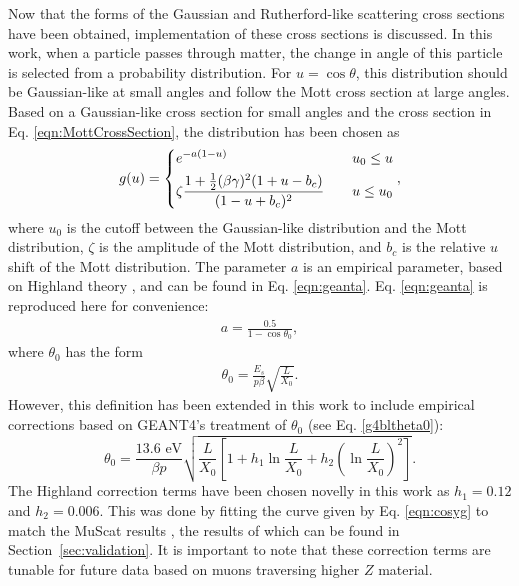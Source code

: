 \label{ssc:COSYScatteringImplementation} Now that the forms of the Gaussian and Rutherford-like scattering cross sections have been obtained, implementation of these cross sections is discussed. In this work, when a particle passes through matter, the change in angle of this particle is selected from a probability distribution. For $u=\cos\theta$, this distribution should be Gaussian-like at small angles \cite{gs} and follow the Mott cross section at large angles. Based on a Gaussian-like cross section for small angles and the cross section in Eq. \eqref{eqn:MottCrossSection}, the distribution has been chosen as
\begin{align}\label{eqn:cosyg}
g(u)=	\begin{dcases}
	e^{-a(1-u)} & \quad u_0 \leq u \\
	\zeta\frac{1+\frac{1}{2}(\beta\gamma)^2(1+u-b_c)}{(1-u+b_c)^2} & \quad u\leq u_0
	\end{dcases},
\end{align}
where $u_0$ is the cutoff between the Gaussian-like distribution and the Mott distribution, $\zeta$ is the amplitude of the Mott distribution, and $b_c$ is the relative $u$ shift of the Mott distribution. The parameter $a$ is an empirical parameter, based on Highland theory \cite{highland}, and can be found in Eq. \eqref{eqn:geanta}. Eq. \eqref{eqn:geanta} is reproduced here for convenience:
\begin{align*}
a=\frac{0.5}{1-\cos\theta_0},
\end{align*}
where $\theta_0$ has the form \cite{highland} 
\begin{align*}
\theta_0 = \frac{E_s}{p\beta} \sqrt{\frac{L}{X_0}}.
\end{align*}
However, this definition has been extended in this work to include empirical corrections based on GEANT4's \cite{geant4} treatment of $\theta_0$ (see Eq. \eqref{g4bltheta0}):
\begin{equation}\label{eqn:cosytheta0}
\theta_0 = \frac{13.6 \text{ eV}}{\beta p} \sqrt{\frac{L}{X_0} \left[ 1+h_1 \ln \frac{L}{X_0} + h_2 \left(\ln \frac{L}{X_0}\right)^2 \right] }.
\end{equation}
The Highland correction terms have been chosen novelly in this work as $h_1=0.12$ and $h_2=0.006$. This was done by fitting the curve given by Eq. \eqref{eqn:cosyg} to match the MuScat results \cite{muscat}, the results of which can be found in Section~\ref{sec:validation}. It is important to note that these correction terms are tunable for future data based on muons traversing higher $Z$ material.

